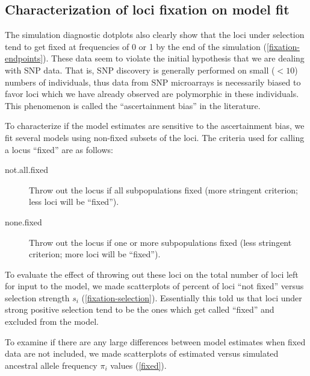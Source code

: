 \documentclass[a4paper,12pt]{article}
\begin{document}
\subsection{Characterization of loci fixation on model fit}

The simulation diagnostic dotplots also clearly show that the loci
under selection tend to get fixed at frequencies of 0 or 1 by the end
of the simulation (\autoref{fixation-endpoints}). These data seem to
violate the initial hypothesis that we are dealing with SNP data. That
is, SNP discovery is generally performed on small ($<10$) numbers of
individuals, thus data from SNP microarrays is necessarily biased to
favor loci which we have already observed are polymorphic in these
individuals. This phenomenon is called the ``ascertainment bias'' in
the literature.

To characterize if the model estimates are sensitive to the
ascertainment bias, we fit several models using non-fixed subsets of
the loci. The criteria used for calling a locus ``fixed'' are as
follows:
\begin{description}
\item[not.all.fixed] Throw out the locus if all subpopulations fixed
  (more stringent criterion; less loci will be ``fixed'').
\item[none.fixed] Throw out the locus if one or more subpopulations
  fixed (less stringent criterion; more loci will be ``fixed'').
\end{description}

To evaluate the effect of throwing out these loci on the total number
of loci left for input to the model, we made scatterplots of percent
of loci ``not fixed'' versus selection strength $s_i$
(\autoref{fixation-selection}). Essentially this told us that loci
under strong positive selection tend to be the ones which get called
``fixed'' and excluded from the model.


To examine if there are any large differences between model estimates
when fixed data are not included, we made scatterplots of estimated
versus simulated ancestral allele frequency $\pi_i$ values
(\autoref{fixed}).

\end{document}
